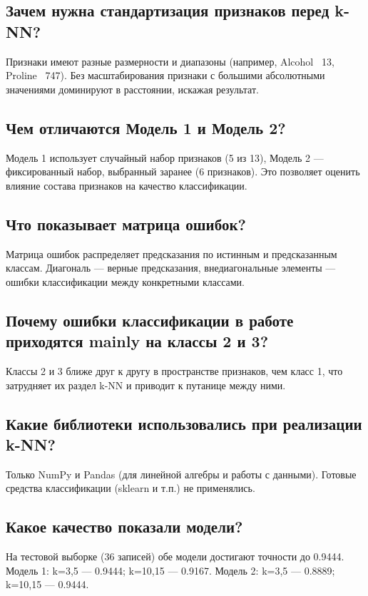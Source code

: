 \documentclass[12pt,a4paper]{article}
\begin{document}
\subsection{Зачем нужна стандартизация признаков перед k-NN?}
Признаки имеют разные размерности и диапазоны (например, Alcohol ~13, Proline ~747). Без масштабирования признаки с большими абсолютными значениями доминируют в расстоянии, искажая результат.

\subsection{Чем отличаются Модель 1 и Модель 2?}
Модель 1 использует случайный набор признаков (5 из 13), Модель 2 --- фиксированный набор, выбранный заранее (6 признаков). Это позволяет оценить влияние состава признаков на качество классификации.

\subsection{Что показывает матрица ошибок?}
Матрица ошибок распределяет предсказания по истинным и предсказанным классам. Диагональ --- верные предсказания, внедиагональные элементы --- ошибки классификации между конкретными классами.

\subsection{Почему ошибки классификации в работе приходятся mainly на классы 2 и 3?}
Классы 2 и 3 ближе друг к другу в пространстве признаков, чем класс 1, что затрудняет их раздел k-NN и приводит к путанице между ними.

\subsection{Какие библиотеки использовались при реализации k-NN?}
Только NumPy и Pandas (для линейной алгебры и работы с данными). Готовые средства классификации (sklearn и т.п.) не применялись.

\subsection{Какое качество показали модели?}
На тестовой выборке (36 записей) обе модели достигают точности до 0.9444. Модель 1: k=3,5 --- 0.9444; k=10,15 --- 0.9167. Модель 2: k=3,5 --- 0.8889; k=10,15 --- 0.9444.
\end{document}
